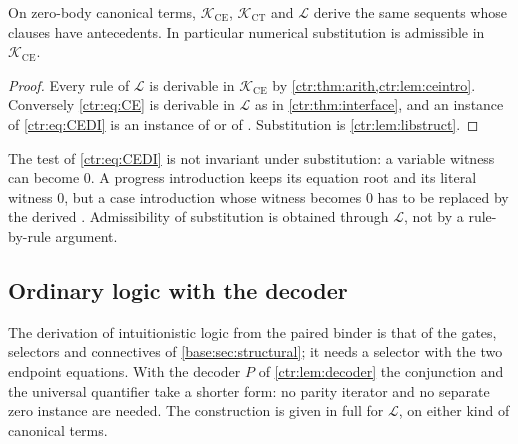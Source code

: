 \begin{theorem}\label{ctr:thm:ceequiv}
On zero-body canonical terms, $\mathcal K_{\mathrm{CE}}$, $\mathcal K_{\mathrm{CT}}$ and
$\mathcal L$ derive the same sequents whose clauses have antecedents. In particular
numerical substitution is admissible in $\mathcal K_{\mathrm{CE}}$.
\end{theorem}
\begin{proof}
Every rule of $\mathcal L$ is derivable in $\mathcal K_{\mathrm{CE}}$ by
\cref{ctr:thm:arith,ctr:lem:ceintro}. Conversely \eqref{ctr:eq:CE} is derivable in
$\mathcal L$ as in \cref{ctr:thm:interface}, and an instance of \eqref{ctr:eq:CEDI} is an
instance of  or of . Substitution is
\cref{ctr:lem:libstruct}.
\end{proof}

The test of \eqref{ctr:eq:CEDI} is not invariant under substitution: a variable witness can
become $0$. A progress introduction keeps its equation root and its literal witness $0$,
but a case introduction whose witness becomes $0$ has to be replaced by the derived
. Admissibility of substitution is obtained through $\mathcal L$, not by a
rule-by-rule argument.

\subsection{Ordinary logic with the decoder}\label{ctr:sec:macros}

The derivation of intuitionistic logic from the paired binder is that of the gates,
selectors and connectives of \cref{base:sec:structural}; it needs a selector with the two
endpoint equations. With the
decoder $P$ of \cref{ctr:lem:decoder} the conjunction and the universal quantifier take a
shorter form: no parity iterator and no separate zero instance are needed. The construction
is given in full for $\mathcal L$, on either kind of canonical terms.


